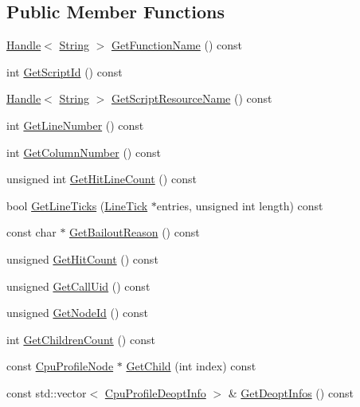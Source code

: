 \subsection*{Public Member Functions}
\begin{DoxyCompactItemize}
\item 
\hyperlink{classv8_1_1_local}{Handle}$<$ \hyperlink{classv8_1_1_string}{String} $>$ \hyperlink{classv8_1_1_cpu_profile_node_affbc7842b66986012285602ab65aa5f8}{Get\+Function\+Name} () const 
\item 
int \hyperlink{classv8_1_1_cpu_profile_node_acf6f384df08ec40ff306d3e229f77258}{Get\+Script\+Id} () const 
\item 
\hyperlink{classv8_1_1_local}{Handle}$<$ \hyperlink{classv8_1_1_string}{String} $>$ \hyperlink{classv8_1_1_cpu_profile_node_a140dd536e7096701a36be0083c18c268}{Get\+Script\+Resource\+Name} () const 
\item 
int \hyperlink{classv8_1_1_cpu_profile_node_a45ea035661c7152e4f3eb47f73787a75}{Get\+Line\+Number} () const 
\item 
int \hyperlink{classv8_1_1_cpu_profile_node_a43cf237ea6f254a61a6e2a81d554aa1a}{Get\+Column\+Number} () const 
\item 
unsigned int \hyperlink{classv8_1_1_cpu_profile_node_ac0d6015d3859e29db07f6a7e574426d3}{Get\+Hit\+Line\+Count} () const 
\item 
bool \hyperlink{classv8_1_1_cpu_profile_node_af31611e24f47519e82b52b49969ed0a4}{Get\+Line\+Ticks} (\hyperlink{structv8_1_1_cpu_profile_node_1_1_line_tick}{Line\+Tick} $\ast$entries, unsigned int length) const 
\item 
const char $\ast$ \hyperlink{classv8_1_1_cpu_profile_node_a16cd3d8d7ef307784838a35022507031}{Get\+Bailout\+Reason} () const 
\item 
unsigned \hyperlink{classv8_1_1_cpu_profile_node_a8d297f185b0bbd9f6853f6ed193b656e}{Get\+Hit\+Count} () const 
\item 
unsigned \hyperlink{classv8_1_1_cpu_profile_node_a245092eb223b948fc9441664d9e2701e}{Get\+Call\+Uid} () const 
\item 
unsigned \hyperlink{classv8_1_1_cpu_profile_node_ae2971c5003353a984ef72b6cddf5e298}{Get\+Node\+Id} () const 
\item 
int \hyperlink{classv8_1_1_cpu_profile_node_ac4612b91e43a2901ac20c3705288955b}{Get\+Children\+Count} () const 
\item 
const \hyperlink{classv8_1_1_cpu_profile_node}{Cpu\+Profile\+Node} $\ast$ \hyperlink{classv8_1_1_cpu_profile_node_aa397db1e0f5147155164c5ea3e854d69}{Get\+Child} (int index) const 
\item 
const std\+::vector$<$ \hyperlink{structv8_1_1_cpu_profile_deopt_info}{Cpu\+Profile\+Deopt\+Info} $>$ \& \hyperlink{classv8_1_1_cpu_profile_node_aaca90265c1dd6dc0ba39c3d0af24ae5c}{Get\+Deopt\+Infos} () const 
\end{DoxyCompactItemize}
